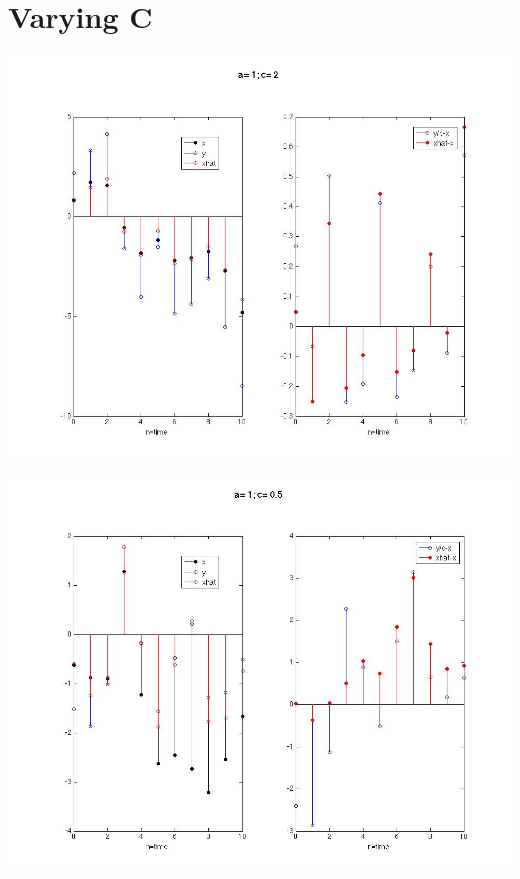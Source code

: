 \documentclass[leqno]{article}
\begin{document}
\section{Varying C}
\begin{center}\includegraphics[scale=0.3]{fig5}\end{center}

\begin{center}\includegraphics[scale=0.3]{fig6}\end{center}
\end{document}
